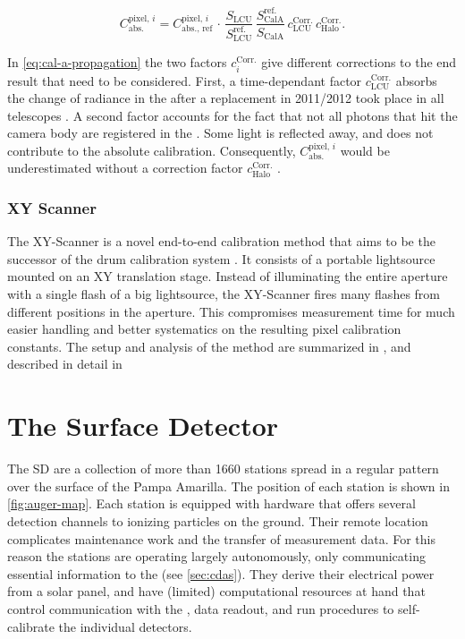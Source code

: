 \begin{equation}
\label{eq:cal-a-propagation}
C^{\mathrm{pixel},\,i}_{\mathrm{abs.}} = C^{\mathrm{pixel},\,i}_{\mathrm{abs.},\,\mathrm{ref}}\,\cdot\,\frac{S_\mathrm{LCU}}{S_\mathrm{LCU}^\mathrm{ref.}}\,\frac{S_\mathrm{CalA}^\mathrm{ref.}}{S_\mathrm{CalA}}\,c_\mathrm{LCU}^\mathrm{Corr.}\,c^\mathrm{Corr.}_\mathrm{Halo}.
\end{equation}

In \cref{eq:cal-a-propagation} the two factors $c^\mathrm{Corr.}_i$ give 
different corrections to the end result that need to be considered. First, a 
time-dependant factor $c^\mathrm{Corr.}_\mathrm{LCU}$ absorbs the change of 
radiance in the \LCU \LED after a replacement in 2011/2012 took place in all 
telescopes \cite{menshikovLEDCalibrationUnit}. A second factor accounts for the
fact that not all photons that hit the camera body are registered in the \PMTs. 
Some light is reflected away, and does not contribute to the absolute 
calibration. Consequently, $C^{\mathrm{pixel},\,i}_\mathrm{abs.}$ would be 
underestimated without a correction factor $c^\mathrm{Corr.}_\mathrm{Halo}$ 
\cite{brackFluorescenceDetectorAbsolute13}.

\subsubsection{XY Scanner}
\label{sssec:xy-scanner}

The XY-Scanner is a novel end-to-end calibration method that aims to be the
successor of the drum calibration system 
\cite{engelNewEndtoendCalibration2017}. It consists of a portable \IS 
lightsource mounted on an XY translation stage. Instead of illuminating the 
entire aperture with a single flash of a big lightsource, the XY-Scanner fires 
many flashes from different positions in the aperture. This compromises 
measurement time for much easier handling and better systematics on the 
resulting pixel calibration constants. The setup and analysis of the method are
summarized in , and described in detail in 
\cite{schaferXYScannerVersatileMethod2023}

\section{The Surface Detector}
\label{sec:sd}

The \acf{SD} are a collection of more than 1660 stations spread in a regular 
pattern over the surface of the Pampa Amarilla. The position of each station is
shown in \cref{fig:auger-map}. Each station is equipped with hardware that 
offers several detection channels to ionizing particles on the ground. Their 
remote location complicates maintenance work and the transfer of measurement 
data. For this reason the stations are operating largely autonomously, only 
communicating essential information to the \CDAS (see \cref{sec:cdas}). They 
derive their electrical power from a solar panel, and have (limited) 
computational resources at hand that control communication with the \CDAS, data
readout, and run procedures to self-calibrate the individual detectors. 

